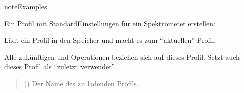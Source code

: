 \documentclass[letterpaper,10pt,english]{sphinxmanual}
\begin{document}
\begin{fulllineitems}
\begin{fulllineitems}
\begin{sphinxadmonition}{note}{Examples}
\begin{sphinxVerbatim}[commandchars=\\\{\}]
\end{sphinxVerbatim}

\sphinxAtStartPar
Ein Profil mit Standard\sphinxhyphen{}Einstellungen für ein Spektrometer erstellen:

\begin{sphinxVerbatim}[commandchars=\\\{\}]
  
     
     
 
\end{sphinxVerbatim}
\end{sphinxadmonition}

\end{fulllineitems}


\begin{fulllineitems}
\label{\detokenize{modulab/profile_manager:modules.profile.ProfileManager.ProfileManager.load_profile}}
\pysigstartsignatures
\pysiglinewithargsret
{}
{}
{}
\pysigstopsignatures
\sphinxAtStartPar
Lädt ein Profil in den Speicher und macht es zum “aktuellen” Profil.

\sphinxAtStartPar
Alle zukünftigen \sphinxhyphen{} und \sphinxhyphen{}Operationen beziehen sich
auf dieses Profil. Setzt auch dieses Profil als “zuletzt verwendet”.
\begin{quote}\begin{description}
\sphinxAtStartPar
{} () \textendash{} Der Name des zu ladenden Profils.


\end{description}
\end{quote}
\end{fulllineitems}
\end{fulllineitems}
\end{document}
